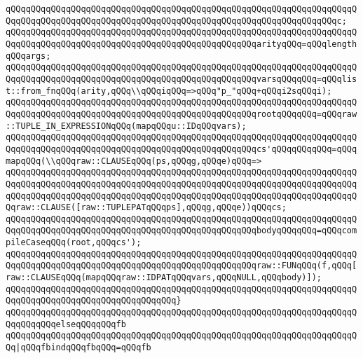\verb|qQQqqQQqqQQqqQQqqQQqqQQqqQQqqQQqqQQqqQQqqQQqqQQqqQQqqQQqqQQqqQQqqQQqqQQqqQQqqQQqqQQqqQQqqQQqqQQqqQQqqQQqqQQqqQQqqQQqqQQqqQQqqQQqqQQqqQQqc;|\newline
\newline
\verb|qQQqqQQqqQQqqQQqqQQqqQQqqQQqqQQqqQQqqQQqqQQqqQQqqQQqqQQqqQQqqQQqqQQqqQQqqQQqqQQqqQQqqQQqqQQqqQQqqQQqqQQqqQQqqQQqqQQqqQQqarityqQQq=qQQqlengthqQQqargs;|\newline
\verb|qQQqqQQqqQQqqQQqqQQqqQQqqQQqqQQqqQQqqQQqqQQqqQQqqQQqqQQqqQQqqQQqqQQqqQQqqQQqqQQqqQQqqQQqqQQqqQQqqQQqqQQqqQQqqQQqqQQqqQQqvarsqQQqqQQq=qQQqlist::from_fnqQQq(arity,qQQq\\qQQqiqQQq=>qQQq"p_"qQQq+qQQqi2sqQQqi);|\newline
\verb|qQQqqQQqqQQqqQQqqQQqqQQqqQQqqQQqqQQqqQQqqQQqqQQqqQQqqQQqqQQqqQQqqQQqqQQqqQQqqQQqqQQqqQQqqQQqqQQqqQQqqQQqqQQqqQQqqQQqqQQqrootqQQqqQQq=qQQqraw::TUPLE_IN_EXPRESSIONqQQq(mapqQQqu::IDqQQqvars);|\newline
\verb|qQQqqQQqqQQqqQQqqQQqqQQqqQQqqQQqqQQqqQQqqQQqqQQqqQQqqQQqqQQqqQQqqQQqqQQqqQQqqQQqqQQqqQQqqQQqqQQqqQQqqQQqqQQqqQQqqQQqqQQqcs'qQQqqQQqqQQq=qQQqmapqQQq(\\qQQqraw::CLAUSEqQQq(ps,qQQqg,qQQqe)qQQq=>|\newline
\verb|qQQqqQQqqQQqqQQqqQQqqQQqqQQqqQQqqQQqqQQqqQQqqQQqqQQqqQQqqQQqqQQqqQQqqQQqqQQqqQQqqQQqqQQqqQQqqQQqqQQqqQQqqQQqqQQqqQQqqQQqqQQqqQQqqQQqqQQqqQQqqQQqqQQqqQQqqQQqqQQqqQQqqQQqqQQqqQQqqQQqqQQqqQQqqQQqqQQqqQQqqQQqqQQqqQQqraw::CLAUSE([raw::TUPLEPATqQQqps],qQQqg,qQQqe))qQQqcs;|\newline
\verb|qQQqqQQqqQQqqQQqqQQqqQQqqQQqqQQqqQQqqQQqqQQqqQQqqQQqqQQqqQQqqQQqqQQqqQQqqQQqqQQqqQQqqQQqqQQqqQQqqQQqqQQqqQQqqQQqqQQqqQQqbodyqQQqqQQq=qQQqcompileCaseqQQq(root,qQQqcs');|\newline
\newline
\verb|qQQqqQQqqQQqqQQqqQQqqQQqqQQqqQQqqQQqqQQqqQQqqQQqqQQqqQQqqQQqqQQqqQQqqQQqqQQqqQQqqQQqqQQqqQQqqQQqqQQqqQQqqQQqqQQqqQQqqQQqraw::FUNqQQq(f,qQQq[raw::CLAUSEqQQq(mapqQQqraw::IDPATqQQqvars,qQQqNULL,qQQqbody)]);|\newline
\verb|qQQqqQQqqQQqqQQqqQQqqQQqqQQqqQQqqQQqqQQqqQQqqQQqqQQqqQQqqQQqqQQqqQQqqQQqqQQqqQQqqQQqqQQqqQQqqQQqqQQqqQQq}|\newline
\verb|qQQqqQQqqQQqqQQqqQQqqQQqqQQqqQQqqQQqqQQqqQQqqQQqqQQqqQQqqQQqqQQqqQQqqQQqqQQqqQQqelseqQQqqQQqfb|\newline
\verb|qQQqqQQqqQQqqQQqqQQqqQQqqQQqqQQqqQQqqQQqqQQqqQQqqQQqqQQqqQQqqQQqqQQqqQQq|\verb#|qQQqfbindqQQqfbqQQq=qQQqfb#\newline
